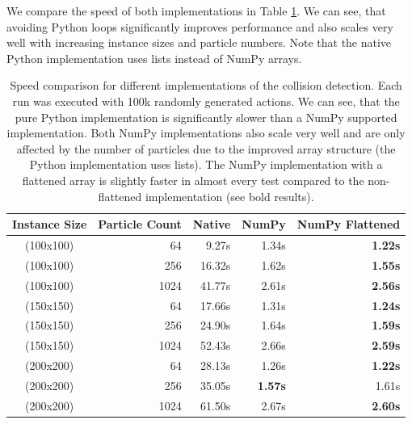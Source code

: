 We compare the speed of both implementations in Table \ref{tab:MazeImplementation/CollisionDetectionSpeed}. We can see, that avoiding Python loops significantly improves performance and also scales very well with increasing instance sizes and particle numbers. Note that the native Python implementation uses lists instead of NumPy arrays.


\begin{table}[htp]
    \begin{center}
        \begin{tabular}{crrrr}
            \toprule
            \multicolumn{1}{c}{Instance Size} & \multicolumn{1}{c}{Particle Count} & \multicolumn{1}{c}{Native} & \multicolumn{1}{c}{NumPy} & \multicolumn{1}{c}{NumPy Flattened} \\
            \midrule
            (100x100) & 64 & 9.27s & 1.34s & \textbf{1.22s} \\
            (100x100) & 256 & 16.32s & 1.62s & \textbf{1.55s} \\
            (100x100) & 1024 & 41.77s & 2.61s & \textbf{2.56s} \\
            \midrule
            (150x150) & 64 & 17.66s & 1.31s & \textbf{1.24s} \\
            (150x150) & 256 & 24.90s & 1.64s & \textbf{1.59s} \\
            (150x150) & 1024 & 52.43s & 2.66s & \textbf{2.59s} \\
            \midrule
            (200x200) & 64 & 28.13s & 1.26s & \textbf{1.22s} \\
            (200x200) & 256 & 35.05s & \textbf{1.57s} & 1.61s \\
            (200x200) & 1024 & 61.50s & 2.67s & \textbf{2.60s} \\
            \bottomrule
        \end{tabular}
    \end{center}
    \caption[Speed Comparison for Different Collision Detection Implementations]{Speed comparison for different implementations of the collision detection. Each run was executed with 100k randomly generated actions. We can see, that the pure Python implementation is significantly slower than a NumPy supported implementation. Both NumPy implementations also scale very well and are only affected by the number of particles due to the improved array structure (the Python implementation uses lists). The NumPy implementation with a flattened array is slightly faster in almost every test compared to the non-flattened implementation (see bold results).} \label{tab:MazeImplementation/CollisionDetectionSpeed}
\end{table}

